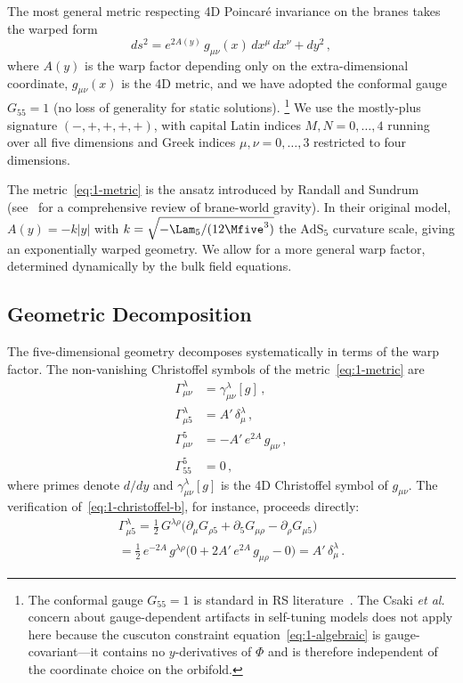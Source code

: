 The most general metric respecting 4D Poincar\'{e} invariance on the branes takes the warped form
\begin{equation}
\label{eq:1-metric}
ds^2 = e^{2A(y)}\, g_{\mu\nu}(x)\, dx^\mu\, dx^\nu + dy^2\,,
\end{equation}
where $A(y)$ is the warp factor depending only on the extra-dimensional coordinate, $g_{\mu\nu}(x)$ is the 4D metric, and we have adopted the conformal gauge $G_{55} = 1$ (no loss of generality for static solutions).%
\footnote{The conformal gauge $G_{55} = 1$ is standard in RS literature~\cite{ch1:rs1}. The Csaki \textit{et al.}~\cite{ch1:csaki00} concern about gauge-dependent artifacts in self-tuning models does not apply here because the cuscuton constraint equation~\eqref{eq:1-algebraic} is gauge-covariant---it contains no $y$-derivatives of $\Phi$ and is therefore independent of the coordinate choice on the orbifold.}
We use the mostly-plus signature $(-,+,+,+,+)$, with capital Latin indices $M, N = 0,\ldots,4$ running over all five dimensions and Greek indices $\mu, \nu = 0,\ldots,3$ restricted to four dimensions.

The metric~\eqref{eq:1-metric} is the ansatz introduced by Randall and Sundrum~\cite{ch1:rs1} (see~\cite{ch1:maartens04} for a comprehensive review of brane-world gravity). In their original model, $A(y) = -k|y|$ with $k = \sqrt{-\Lam_5/(12\Mfive^3)}$ the $\mathrm{AdS}_5$ curvature scale, giving an exponentially warped geometry. We allow for a more general warp factor, determined dynamically by the bulk field equations.

\subsection{Geometric Decomposition}
\label{sec:1-decomposition}

The five-dimensional geometry decomposes systematically in terms of the warp factor. The non-vanishing Christoffel symbols of the metric~\eqref{eq:1-metric} are
\begin{subequations}
\label{eq:1-christoffel}
\begin{align}
\Gamma^\lambda_{\mu\nu} &= \gamma^\lambda_{\mu\nu}[g]\,, \label{eq:1-christoffel-a}\\
\Gamma^\lambda_{\mu 5} &= A'\, \delta^\lambda_\mu\,, \label{eq:1-christoffel-b}\\
\Gamma^5_{\mu\nu} &= -A'\, e^{2A}\, g_{\mu\nu}\,, \label{eq:1-christoffel-c}\\
\Gamma^5_{55} &= 0\,, \label{eq:1-christoffel-d}
\end{align}
\end{subequations}
where primes denote $d/dy$ and $\gamma^\lambda_{\mu\nu}[g]$ is the 4D Christoffel symbol of $g_{\mu\nu}$. The verification of~\eqref{eq:1-christoffel-b}, for instance, proceeds directly:
\begin{multline}
\label{eq:1-christoffel-verify}
\Gamma^\lambda_{\mu 5} = \tfrac{1}{2}\, G^{\lambda\rho}\bigl(\partial_\mu G_{\rho 5} + \partial_5 G_{\mu\rho} - \partial_\rho G_{\mu 5}\bigr) \\
= \tfrac{1}{2}\, e^{-2A}\, g^{\lambda\rho}\bigl(0 + 2A'\, e^{2A}\, g_{\mu\rho} - 0\bigr)
= A'\, \delta^\lambda_\mu\,.
\end{multline}


